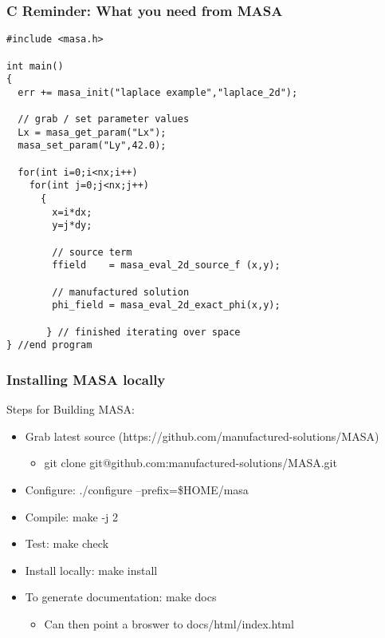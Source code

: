 \documentclass[mathserif]{beamer}
\begin{document}
\begin{frame}[fragile]
\frametitle{C Reminder: What you need from MASA}
{\tiny
\begin{verbatim}
#include <masa.h>

int main()
{
  err += masa_init("laplace example","laplace_2d");

  // grab / set parameter values
  Lx = masa_get_param("Lx");
  masa_set_param("Ly",42.0);

  for(int i=0;i<nx;i++)
    for(int j=0;j<nx;j++)
      {  
        x=i*dx;
        y=j*dy;

        // source term
        ffield    = masa_eval_2d_source_f (x,y);

        // manufactured solution
        phi_field = masa_eval_2d_exact_phi(x,y);

       } // finished iterating over space
} //end program
\end{verbatim}
}
\end{frame}
	   
\begin{frame}
  \frametitle{Installing MASA locally}
  \begin{block}{Steps for Building MASA:}
    \begin{itemize}
      \item Grab latest source (https://github.com/manufactured-solutions/MASA)
	    \begin{itemize}
	     \item git clone git@github.com:manufactured-solutions/MASA.git
	    \end{itemize}
      \item Configure: ./configure --prefix=\$HOME/masa %
      \item Compile: make -j 2
      \item Test: make check
      \item Install locally: make install
      \item To generate documentation: make docs 
	\begin{itemize}
	  \item Can then point a broswer to docs/html/index.html
	\end{itemize}
     \end{itemize}
   \end{block}

\end{frame}
\end{document}
